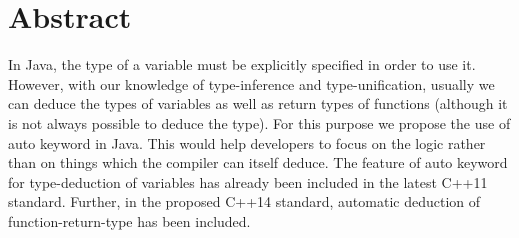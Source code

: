\section{Abstract}
In Java, the type of a variable must be explicitly specified in order to use it. However, with our knowledge of type-inference and type-unification, usually we can deduce the types of variables as well as return types of functions (although it is not always possible to deduce the type). For this purpose we propose the use of auto keyword in Java. This would help developers to focus on the logic rather than on things which the compiler can itself deduce. The feature of auto keyword for type-deduction of variables has already been included in the latest C++11 standard. Further, in the proposed C++14 standard, automatic deduction of function-return-type has been included. 
